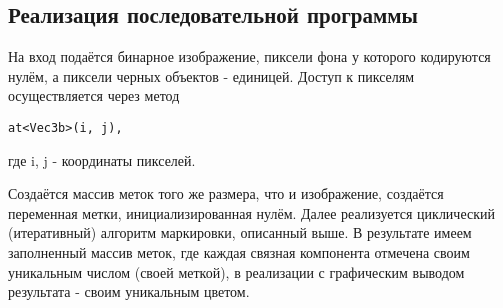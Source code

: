 \documentclass{report}
\begin{document}
\subsection{Реализация последовательной программы}
На вход подаётся бинарное изображение, пиксели фона у которого кодируются нулём, а пиксели черных объектов - единицей. Доступ к пикселям осуществляется через метод 
\begin{lstlisting}
at<Vec3b>(i, j),
\end{lstlisting}
где i, j - координаты пикселей.
\par Создаётся массив меток того же размера, что и изображение, создаётся переменная метки, инициализированная нулём. Далее реализуется циклический (итеративный) алгоритм маркировки, описанный выше. В результате имеем заполненный массив меток, где каждая связная компонента отмечена своим уникальным числом (своей меткой), в реализации с графическим выводом результата - своим уникальным цветом. 
\end{document}
